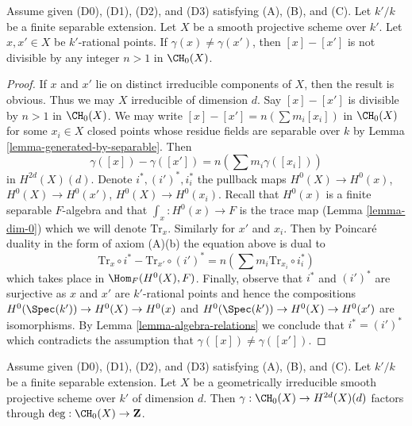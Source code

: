 \begin{lemma}
\label{lemma-relations-classes-points}
Assume given (D0), (D1), (D2), and (D3) satisfying (A), (B), and (C).
Let $k'/k$ be a finite separable extension.
Let $X$ be a smooth projective scheme over $k'$.
Let $x, x' \in X$ be $k'$-rational points.
If $\gamma(x) \not = \gamma(x')$, then
$[x] - [x']$ is not divisible by any integer $n > 1$ in $\CH_0(X)$.
\end{lemma}

\begin{proof}
If $x$ and $x'$ lie on distinct irreducible components of $X$, then
the result is obvious. Thus we may $X$ irreducible of dimension $d$.
Say $[x] - [x']$ is divisible by $n > 1$ in $\CH_0(X)$.
We may write $[x] - [x'] = n(\sum m_i [x_i])$ in $\CH_0(X)$
for some $x_i \in X$ closed points
whose residue fields are separable over $k$ by
Lemma \ref{lemma-generated-by-separable}.
Then
$$
\gamma([x]) - \gamma([x']) = n (\sum m_i \gamma([x_i]))
$$
in $H^{2d}(X)(d)$. Denote $i^*, (i')^*, i_i^*$ the pullback maps
$H^0(X) \to H^0(x)$, $H^0(X) \to H^0(x')$, $H^0(X) \to H^0(x_i)$.
Recall that $H^0(x)$ is a finite separable $F$-algebra
and that $\int_x : H^0(x) \to F$ is the trace map
(Lemma \ref{lemma-dim-0}) which we will denote $\text{Tr}_x$.
Similarly for $x'$ and $x_i$. Then by Poincar\'e duality in the form of
axiom (A)(b) the equation above is dual to
$$
\text{Tr}_x \circ i^* - \text{Tr}_{x'} \circ (i')^* =
n(\sum m_i \text{Tr}_{x_i} \circ i_i^*)
$$
which takes place in $\Hom_F(H^0(X), F)$. Finally, observe that
$i^*$ and $(i')^*$ are surjective as $x$ and $x'$ are $k'$-rational
points and hence the compositions $H^0(\Spec(k')) \to H^0(X) \to H^0(x)$
and $H^0(\Spec(k')) \to H^0(X) \to H^0(x')$ are isomorphisms.
By Lemma \ref{lemma-algebra-relations} we conclude that $i^* = (i')^*$
which contradicts the assumption that $\gamma([x]) \not = \gamma([x'])$.
\end{proof}

\begin{lemma}
\label{lemma-classes-points}
Assume given (D0), (D1), (D2), and (D3) satisfying (A), (B), and (C).
Let $k'/k$ be a finite separable extension. Let $X$ be a geometrically
irreducible smooth projective scheme over $k'$ of dimension $d$.
Then $\gamma : \CH_0(X) \to H^{2d}(X)(d)$ factors through
$\deg : \CH_0(X) \to \mathbf{Z}$.
\end{lemma}

